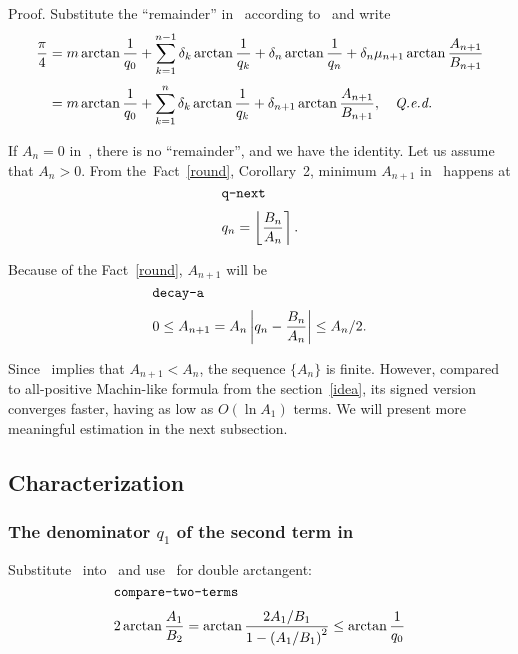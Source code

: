 \documentclass[draft, 11pt]{article} %
\def\fact#1{Fact~\ref{#1}}
\begin{document}
Proof. Substitute the ``remainder'' in~
according to~ and write
$$
\begin{array}{ll}
\dfrac{\pi}{4} = m \arctan\dfrac{1}{q_0}
    + \sum_{k=1}^{n-1} \delta_k \arctan\dfrac{1}{q_k}
    + \delta_n \arctan\dfrac{1}{q_n}
    + \delta_n \mu_{n+1} \arctan\dfrac{A_{n+1}}{B_{n+1}} \\[16pt]
\phantom{\dfrac{\pi}{4}} = m \arctan\dfrac{1}{q_0}
    + \sum_{k=1}^n \delta_k \arctan\dfrac{1}{q_k}
    + \delta_{n+1} \arctan\dfrac{A_{n+1}}{B_{n+1}}, \quad\hbox{\qed}
\end{array}
$$

If $A_n = 0$ in~, there is no ``remainder'', and we have the
identity. Let us assume that $A_n > 0$.
From the~\fact{round}, Corollary~2, minimum $A_{n+1}$ in~
happens at
%
\begin{equation}\mlabel{q-next}
q_n = \nround{\dfrac{B_n}{A_n}}.
\end{equation}

Because of the \fact{round}, $A_{n+1}$ will be
%
\begin{equation}\mlabel{decay-a}
0 \le A_{n+1} = A_n \absolute{q_n - \dfrac{B_n}{A_n}} \le A_n / 2.
\end{equation}

Since~ implies that $A_{n+1} < A_n$, the sequence $\{ A_n \}$ is finite.
However, compared to all-positive Machin-like formula from the section~\ref{idea},
its signed version~ converges faster, having as low as
$O(\ln A_1)$ terms. We will present more meaningful estimation in the next
subsection.

\subsection{Characterization}

\subsubsection{The denominator $q_1$ of the second term in~}

Substitute~ into~ and use~
for double arctangent:
%
\begin{equation}\mlabel{compare-two-terms}
2\arctan \dfrac{A_1}{B_2} = \arctan \dfrac{2A_1/B_1}{1-\left(A_1/B_1\right)^2} \le \arctan \dfrac{1}{q_0}
\end{equation}
\end{document}
